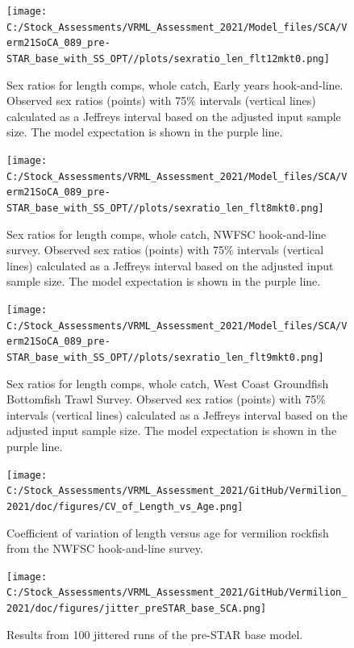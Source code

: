 \documentclass[
  english,
  a4paper,
]{article}
\begin{document}
\begin{figure}
\centering
\texttt{[image: C:/Stock\_Assessments/VRML\_Assessment\_2021/Model\_files/SCA/Verm21SoCA\_089\_pre-STAR\_base\_with\_SS\_OPT//plots/sexratio\_len\_flt12mkt0.png]}
\caption{Sex ratios for length comps, whole catch, Early years hook-and-line. Observed sex ratios (points) with 75\% intervals (vertical lines) calculated as a Jeffreys interval based on the adjusted input sample size. The model expectation is shown in the purple line.\label{fig:sexratio-EARLY-HKL}}
\end{figure}

\begin{figure}
\centering
\texttt{[image: C:/Stock\_Assessments/VRML\_Assessment\_2021/Model\_files/SCA/Verm21SoCA\_089\_pre-STAR\_base\_with\_SS\_OPT//plots/sexratio\_len\_flt8mkt0.png]}
\caption{Sex ratios for length comps, whole catch, NWFSC hook-and-line survey. Observed sex ratios (points) with 75\% intervals (vertical lines) calculated as a Jeffreys interval based on the adjusted input sample size. The model expectation is shown in the purple line.\label{fig:sexratio-NWFSC-HKL}}
\end{figure}

\begin{figure}
\centering
\texttt{[image: C:/Stock\_Assessments/VRML\_Assessment\_2021/Model\_files/SCA/Verm21SoCA\_089\_pre-STAR\_base\_with\_SS\_OPT//plots/sexratio\_len\_flt9mkt0.png]}
\caption{Sex ratios for length comps, whole catch, West Coast Groundfish Bottomfish Trawl Survey. Observed sex ratios (points) with 75\% intervals (vertical lines) calculated as a Jeffreys interval based on the adjusted input sample size. The model expectation is shown in the purple line.\label{fig:sexratio-NWFSC-TWL}}
\end{figure}

\FloatBarrier

\begin{figure}
\centering
\texttt{[image: C:/Stock\_Assessments/VRML\_Assessment\_2021/GitHub/Vermilion\_2021/doc/figures/CV\_of\_Length\_vs\_Age.png]}
\caption{Coefficient of variation of length versus age for vermilion rockfish from the NWFSC hook-and-line survey.\label{fig:cv-length-age}}
\end{figure}

\begin{figure}
\centering
\texttt{[image: C:/Stock\_Assessments/VRML\_Assessment\_2021/GitHub/Vermilion\_2021/doc/figures/jitter\_preSTAR\_base\_SCA.png]}
\caption{Results from 100 jittered runs of the pre-STAR base model.\label{fig:jitter}}
\end{figure}
\end{document}
